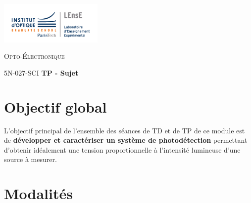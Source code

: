 \documentclass[a4paper,11pt,twoside]{book} %
\begin{document}
\clearpage
\thispagestyle{empty}
\mbox{} %

\clearpage
\setcounter{page}{1} %
\pagestyle{plain} %

\begin{minipage}[c]{.25\linewidth}
	\includegraphics[width=5cm]{images/Logo-LEnsE.png}
\end{minipage} \hfill
\begin{minipage}[c]{.4\linewidth}

\begin{center}
\vspace{0.3cm}
{\Large \textsc{Opto-Électronique}}

\medskip

5N-027-SCI \qquad \textbf{\Large TP - Sujet}

\end{center}
\end{minipage}\hfill


\section{Objectif global}

L'objectif principal de l'ensemble des séances de TD et de TP de ce module est de \textbf{développer et caractériser un système de photodétection} permettant d'obtenir idéalement une tension proportionnelle à l'intensité lumineuse d'une source à mesurer.

\section{Modalités}
\end{document}
